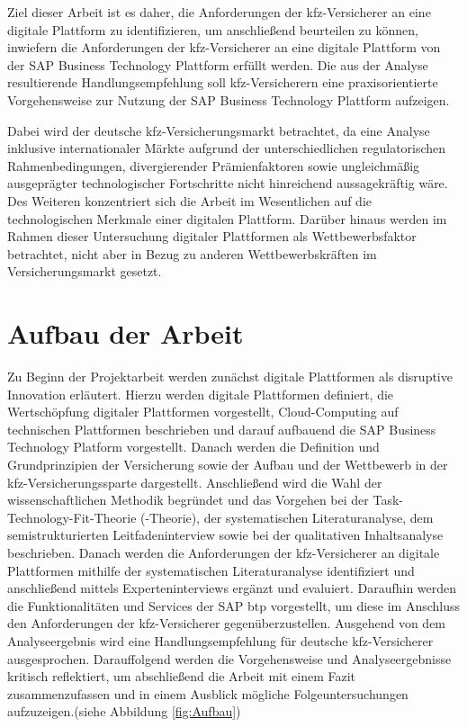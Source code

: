 Ziel dieser Arbeit ist es daher, die Anforderungen der \ac{kfz}-Versicherer an eine digitale Plattform zu identifizieren, um anschließend beurteilen zu können, inwiefern die Anforderungen der \ac{kfz}-Versicherer an eine digitale Plattform von der SAP Business Technology Plattform erfüllt werden. Die aus der Analyse resultierende Handlungsempfehlung soll \ac{kfz}-Versicherern eine praxisorientierte Vorgehensweise zur Nutzung der SAP Business Technology Plattform aufzeigen.

Dabei wird der deutsche \ac{kfz}-Versicherungsmarkt betrachtet, da eine Analyse inklusive internationaler Märkte aufgrund der unterschiedlichen regulatorischen Rahmenbedingungen, divergierender Prämienfaktoren sowie ungleichmäßig ausgeprägter technologischer Fortschritte nicht hinreichend aussagekräftig wäre. Des Weiteren konzentriert sich die Arbeit im Wesentlichen auf die technologischen Merkmale einer digitalen Plattform. Darüber hinaus werden im Rahmen dieser Untersuchung digitaler Plattformen als Wettbewerbsfaktor betrachtet, nicht aber in Bezug zu anderen Wettbewerbskräften im Versicherungsmarkt gesetzt.




\section{Aufbau der Arbeit}

Zu Beginn der Projektarbeit werden zunächst digitale Plattformen als disruptive Innovation erläutert. Hierzu werden digitale Plattformen definiert, die Wertschöpfung digitaler Plattformen vorgestellt, Cloud-Computing auf technischen Plattformen beschrieben und darauf aufbauend die SAP Business Technology Platform vorgestellt. Danach werden die Definition und Grundprinzipien der Versicherung sowie der Aufbau und der Wettbewerb in der \ac{kfz}-Versicherungssparte dargestellt. Anschließend wird die Wahl der wissenschaftlichen Methodik begründet und das Vorgehen bei der Task-Technology-Fit-Theorie (-Theorie), der systematischen Literaturanalyse, dem semistrukturierten Leitfadeninterview sowie bei der qualitativen Inhaltsanalyse beschrieben. Danach werden die Anforderungen der \ac{kfz}-Versicherer an digitale Plattformen mithilfe der systematischen Literaturanalyse identifiziert und anschließend mittels Experteninterviews ergänzt und evaluiert. Daraufhin werden die Funktionalitäten und Services der SAP \ac{btp} vorgestellt, um diese im Anschluss den Anforderungen der \ac{kfz}-Versicherer gegenüberzustellen. Ausgehend von dem Analyseergebnis wird eine Handlungsempfehlung für deutsche \ac{kfz}-Versicherer ausgesprochen. Darauffolgend werden die Vorgehensweise und Analyseergebnisse kritisch reflektiert, um abschließend die Arbeit mit einem Fazit zusammenzufassen und in einem Ausblick mögliche Folgeuntersuchungen aufzuzeigen.(siehe Abbildung \ref{fig:Aufbau})


